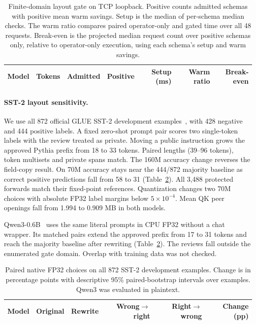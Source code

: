 \documentclass[runningheads]{llncs}
\begin{document}
\begin{table}[!ht]
\centering
\caption{Finite-domain layout gate on TCP loopback. Positive counts
admitted schemas with positive mean warm savings. Setup is the median
of per-schema median checks. The warm ratio compares paired
operator-only and gated time over all 48 requests. Break-even is the
projected median request count over positive schemas only, relative to
operator-only execution, using each schema's setup and warm savings.}
\label{tab:gate}
\small\renewcommand{\arraystretch}{1.08}\setlength{\tabcolsep}{4pt}
\begin{tabular}{@{}llrrrrr@{}}
\toprule
Model & Tokens & Admitted & Positive & Setup (ms) & Warm ratio & Break-even\\
\midrule

\end{tabular}
\end{table}

\paragraph{SST-2 layout sensitivity.}
We use all 872 official GLUE SST-2 development examples~\cite{sst,glue},
with 428 negative and 444 positive labels. A fixed zero-shot prompt pair
scores two single-token labels with the review treated as private.
Moving a public instruction grows the approved Pythia prefix from 18 to
33 tokens. Paired lengths (39--96 tokens), token multisets and private
spans match. The 160M accuracy change reverses the field-copy result.
On 70M accuracy stays near the 444/872 majority baseline as correct
positive predictions fall from 58 to 31 (Table~\ref{tab:sst2}).
All 3,488 protected forwards match their fixed-point references.
Quantization changes two 70M choices with absolute FP32 label margins
below $5\times10^{-4}$. Mean QK peer openings fall from 1.994 to
0.909 MB in both models.

Qwen3-0.6B~\cite{qwen3} uses the same literal prompts in CPU FP32
without a chat wrapper. Its matched pairs extend the approved prefix
from 17 to 31 tokens and reach the majority baseline after rewriting
(Table~\ref{tab:sst2}). The reviews fall outside the enumerated gate
domain. Overlap with training data was not checked.

\begin{table}[!ht]
\centering
\caption{Paired native FP32 choices on all 872 SST-2 development
examples. Change is in percentage points with descriptive 95\%
paired-bootstrap intervals over examples. Qwen3 was evaluated in
plaintext.}
\label{tab:sst2}
\small\renewcommand{\arraystretch}{1.12}\setlength{\tabcolsep}{5pt}
\begin{tabular}{@{}lrrrrr@{}}
\toprule
Model & Original & Rewrite & Wrong$\to$right & Right$\to$wrong & Change (pp)\\
\midrule

\end{tabular}
\end{table}
\end{document}
